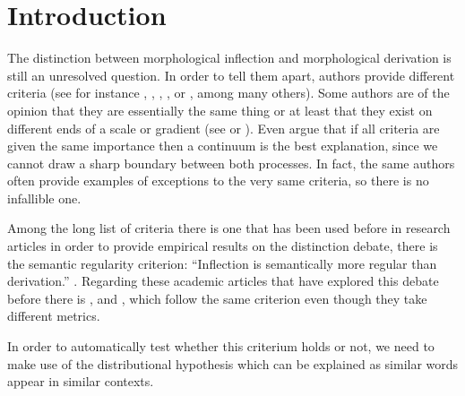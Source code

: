 \documentclass[12pt]{article}
\begin{document}
\newpage
\section{Introduction}
The distinction between morphological inflection and morphological derivation is still an unresolved question. In order to tell them apart, authors provide different criteria (see for instance \textcite{booij2006InflectionDerivation}, \textcite{aronoff2011WhatMorphology}, \textcite{booij2012GrammarWordsIntroduction}, \textcite{haspelmath2013UnderstandingMorphology}, \textcite{stump2005WordFormationInflectionalMorphology} or \textcite{stump2017Inflection}, among many others). Some authors are of the opinion that they are essentially the same thing \parencite{haspelmath2024InflectionDerivationTraditional} or at least that they exist on different ends of a scale or gradient (see \textcite{bybee1985MorphologyStudyRelation} or \textcite{stekauer2015DelimitationDerivationInflection}). Even \textcite{haspelmath2013UnderstandingMorphology} argue that if all criteria are given the same importance then a continuum is the best explanation, since we cannot draw a sharp boundary between both processes. In fact, the same authors often provide examples of exceptions to the very same criteria, so there is no infallible one.


Among the long list of criteria there is one that has been used before in research articles in order to provide empirical results on the distinction debate, there is the semantic regularity criterion: \enquote{Inflection is semantically more regular than derivation.} \parencite{stump2005WordFormationInflectionalMorphology}. Regarding these academic articles that have explored this debate before there is \textcite{bonami2018InflectionVsDerivation}, \textcite{rosa2019AttemptingSeparateInflection} and \textcite{haley2024CorpusbasedMeasuresDiscriminate}, which follow the same criterion even though they take different metrics.

In order to automatically test whether this criterium holds or not, we need to make use of the distributional hypothesis which can be explained as similar words appear in similar contexts. 

\end{document}
